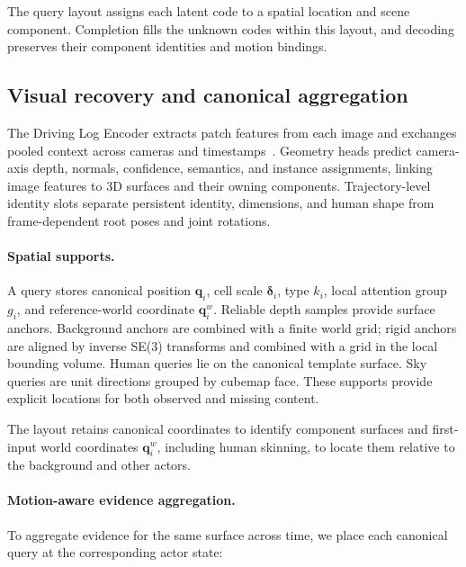 The query layout assigns each latent code to a spatial location and scene component. Completion fills the unknown codes within this layout, and decoding preserves their component identities and motion bindings.

\subsection{Visual recovery and canonical aggregation}
\label{sec:visual-encoding}

The Driving Log Encoder extracts patch features from each image and exchanges pooled context across cameras and timestamps~\cite{dosovitskiy2021vit,vaswani2017attention}. Geometry heads predict camera-axis depth, normals, confidence, semantics, and instance assignments, linking image features to 3D surfaces and their owning components. Trajectory-level identity slots separate persistent identity, dimensions, and human shape from frame-dependent root poses and joint rotations.

\label{sec:queries}

\paragraph{Spatial supports.}

A query stores canonical position $\mathbf q_i$, cell scale $\boldsymbol\delta_i$, type $k_i$, local attention group $g_i$, and reference-world coordinate $\mathbf q_i^w$. Reliable depth samples provide surface anchors. Background anchors are combined with a finite world grid; rigid anchors are aligned by inverse SE(3) transforms and combined with a grid in the local bounding volume. Human queries lie on the canonical template surface. Sky queries are unit directions grouped by cubemap face. These supports provide explicit locations for both observed and missing content.

The layout retains canonical coordinates to identify component surfaces and first-input world coordinates $\mathbf q_i^w$, including human skinning, to locate them relative to the background and other actors.

\paragraph{Motion-aware evidence aggregation.}

To aggregate evidence for the same surface across time, we place each canonical query at the corresponding actor state:

